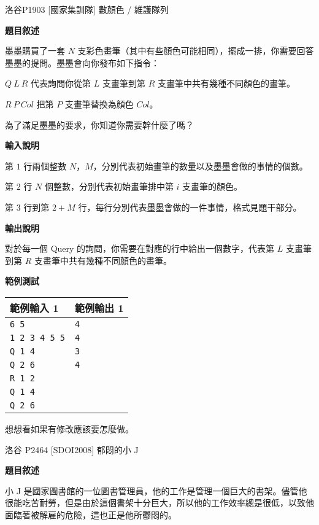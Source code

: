     \problem 洛谷P1903 [國家集訓隊] 數顏色 / 維護隊列

    \textbf{題目敘述}

    墨墨購買了一套 $N$ 支彩色畫筆（其中有些顏色可能相同），擺成一排，你需要回答墨墨的提問。墨墨會向你發布如下指令：

    $Q\ L\ R$ 代表詢問你從第 $L$ 支畫筆到第 $R$ 支畫筆中共有幾種不同顏色的畫筆。
    
    $R\ P\ Col$ 把第 $P$ 支畫筆替換為顏色 $Col$。
    
    為了滿足墨墨的要求，你知道你需要幹什麼了嗎？

    \textbf{輸入說明}

    第 $1$ 行兩個整數 $N$，$M$，分別代表初始畫筆的數量以及墨墨會做的事情的個數。

    第 $2$ 行 $N$ 個整數，分別代表初始畫筆排中第 $i$ 支畫筆的顏色。
    
    第 $3$ 行到第 $2+M$ 行，每行分別代表墨墨會做的一件事情，格式見題干部分。

    \textbf{輸出說明}

    對於每一個 Query 的詢問，你需要在對應的行中給出一個數字，代表第 $L$ 支畫筆到第 $R$ 支畫筆中共有幾種不同顏色的畫筆。

    \textbf{範例測試}

    \begin{tabular}{|m{7cm}|m{7cm}|}
        \hline
        範例輸入 1 & 範例輸出 1 \\
        \hline
        \verb|6 5| & \verb|4| \\
        \verb|1 2 3 4 5 5| & \verb|4| \\
        \verb|Q 1 4| & \verb|3| \\
        \verb|Q 2 6| & \verb|4| \\
        \verb|R 1 2| & \\
        \verb|Q 1 4| & \\
        \verb|Q 2 6| & \\
        \hline
    \end{tabular}

    \begin{tip}
        想想看如果有修改應該要怎麼做。
    \end{tip}

    \problem 洛谷 P2464 [SDOI2008] 郁悶的小 J

    \textbf{題目敘述}

    小 J 是國家圖書館的一位圖書管理員，他的工作是管理一個巨大的書架。儘管他很能吃苦耐勞，但是由於這個書架十分巨大，所以他的工作效率總是很低，以致他面臨著被解雇的危險，這也正是他所鬱悶的。

